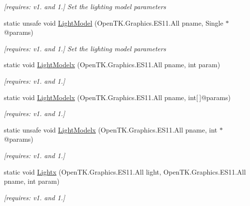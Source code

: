 \begin{DoxyCompactItemize}
\begin{DoxyCompactList}\small\item\em \mbox{[}requires\-: v1. and 1.\mbox{]} Set the lighting model parameters \end{DoxyCompactList}\item 
static unsafe void \hyperlink{class_open_t_k_1_1_graphics_1_1_e_s11_1_1_g_l_a9f2ccffcacfaefb7249ffe35ea505dac}{Light\-Model} (Open\-T\-K.\-Graphics.\-E\-S11.\-All pname, Single $\ast$@params)
\begin{DoxyCompactList}\small\item\em \mbox{[}requires\-: v1. and 1.\mbox{]} Set the lighting model parameters \end{DoxyCompactList}\item 
static void \hyperlink{class_open_t_k_1_1_graphics_1_1_e_s11_1_1_g_l_ac4ee4a8437918ccbba59383f8d788595}{Light\-Modelx} (Open\-T\-K.\-Graphics.\-E\-S11.\-All pname, int param)
\begin{DoxyCompactList}\small\item\em \mbox{[}requires\-: v1. and 1.\mbox{]}\end{DoxyCompactList}\item 
static void \hyperlink{class_open_t_k_1_1_graphics_1_1_e_s11_1_1_g_l_a942bbda3e92b4b5430b23e563fbf0fe6}{Light\-Modelx} (Open\-T\-K.\-Graphics.\-E\-S11.\-All pname, int\mbox{[}$\,$\mbox{]}@params)
\begin{DoxyCompactList}\small\item\em \mbox{[}requires\-: v1. and 1.\mbox{]}\end{DoxyCompactList}\item 
static unsafe void \hyperlink{class_open_t_k_1_1_graphics_1_1_e_s11_1_1_g_l_acc07eaef3ba5a9467247ce71cdf8b908}{Light\-Modelx} (Open\-T\-K.\-Graphics.\-E\-S11.\-All pname, int $\ast$@params)
\begin{DoxyCompactList}\small\item\em \mbox{[}requires\-: v1. and 1.\mbox{]}\end{DoxyCompactList}\item 
static void \hyperlink{class_open_t_k_1_1_graphics_1_1_e_s11_1_1_g_l_a6e38b86d4298d31165bb0e1009a8110f}{Lightx} (Open\-T\-K.\-Graphics.\-E\-S11.\-All light, Open\-T\-K.\-Graphics.\-E\-S11.\-All pname, int param)
\begin{DoxyCompactList}\small\item\em \mbox{[}requires\-: v1. and 1.\mbox{]}\end{DoxyCompactList}\item 

\end{DoxyCompactItemize}
